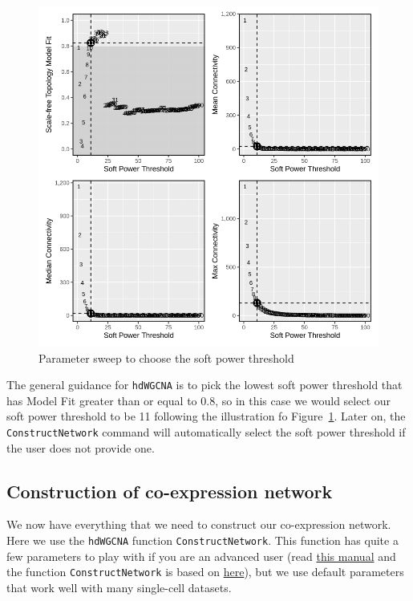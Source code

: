 \documentclass[
  letterpaper,
  DIV=11,
  numbers=noendperiod]{scrartcl}
\begin{document}
\begin{figure}[H]

{\centering \includegraphics{notebook_files/figure-pdf/fig-sweep-output-3.png}

}

\caption{\label{fig-sweep}Parameter sweep to choose the soft power
threshold}

\end{figure}

The general guidance for \texttt{hdWGCNA} is to pick the lowest soft
power threshold that has Model Fit greater than or equal to 0.8, so in
this case we would select our soft power threshold to be 11 following
the illustration fo Figure~\ref{fig-sweep}. Later on, the
\texttt{ConstructNetwork} command will automatically select the soft
power threshold if the user does not provide one.

\hypertarget{construction-of-co-expression-network}{%
\subsection{Construction of co-expression
network}\label{construction-of-co-expression-network}}

We now have everything that we need to construct our co-expression
network. Here we use the \texttt{hdWGCNA} function
\texttt{ConstructNetwork}. This function has quite a few parameters to
play with if you are an advanced user (read
\href{https://rdrr.io/github/smorabit/hdWGCNA/man/ConstructNetwork.html}{this
manual} and the function \texttt{ConstructNetwork} is based on
\href{https://www.rdocumentation.org/packages/WGCNA/versions/1.72-5/topics/blockwiseConsensusModules}{here}),
but we use default parameters that work well with many single-cell
datasets.
\end{document}
